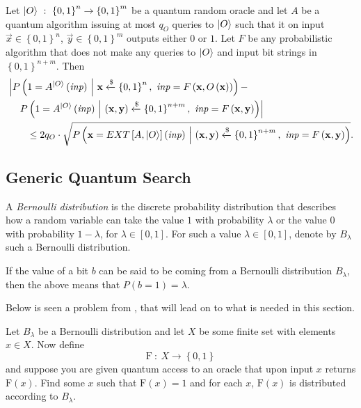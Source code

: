 \begin{lem}
\label{lem:AOW2H}
	Let $\lvert O\rangle \ : \ \left\{ 0,1 \right\}^n \rightarrow \left\{ 0,1 \right\}^m$ be a quantum random oracle and let $A$ be a quantum algorithm issuing at most $q_O$ queries to $\lvert O\rangle$ such that it on input $\vec{x} \in \left\{ 0,1 \right\}^n$, $\vec{y} \in \left\{ 0,1 \right\}^m$ outputs either $0$ or $1$. Let $F$ be any probabilistic algorithm that does not make any queries to $\lvert O\rangle$ and input bit strings in $\left\{ 0,1 \right\}^{n+m}$. Then
\begin{equation*}
	\begin{aligned}
		& \left\vert P\left( 1 = A^{\ket{O}}\left(\mathit{inp}\right) \ \middle\vert \ \vec{x} \xleftarrow{\$} \left\{ 0,1 \right\}^n, \ \mathit{inp} = F\left(\vec{x}, O\left(\vec{x}\right)\right)\right) - \right. \\
			& \quad \left. P\left( 1 = A^{\ket{O}}\left(\mathit{inp}\right) \ \middle\vert \ \left(\vec{x},\vec{y}\right) \xleftarrow{\$} \left\{ 0,1 \right\}^{n+m}, \ \mathit{inp} = F\left(\vec{x},\vec{y}\right) \right) \right\vert \\
			& \qquad \leq 2 q_O \cdot \sqrt{P\left( \vec{x} = EXT\left[A, \ket{O}\right]\left(\mathit{inp}\right) \ \middle\vert \ \left(\vec{x},\vec{y}\right) \xleftarrow{\$} \left\{ 0,1 \right\}^{n+m}, \ \mathit{inp} = F\left(\vec{x},\vec{y}\right)\right) }.
	\end{aligned}
\end{equation*}
\end{lem}



\subsection{Generic Quantum Search}
\label{subsec:genQuaSea}

A \emph{Bernoulli distribution} is the discrete probability distribution that describes how a random variable can take the value $1$ with probability $\lambda$ or the value $0$ with probability $1 - \lambda$, for $\lambda \in \left[0,1\right]$. For such a value $\lambda \in \left[0,1\right]$, denote by $B_{\lambda}$ such a Bernoulli distribution.

If the value of a bit $b$ can be said to be coming from a Bernoulli distribution $B_{\lambda}$, then the above means that $P\left(b = 1\right) = \lambda$.

Below is seen a problem from \cite{HRS,zhandry2}, that will lead on to what is needed in this section.
\begin{prob}
\label{prob:GSP}
	Let $B_{\lambda}$ be a Bernoulli distribution and let $X$ be some finite set with elements $x \in X$. Now define
	\[
		\mathrm{F} \ : \ X \rightarrow \left\{ 0,1 \right\}
	\]
	and suppose you are given quantum access to an oracle that upon input $x$ returns $\mathrm{F}\left(x\right)$. Find some $x$ such that $\mathrm{F}\left(x\right) = 1$ and for each $x$, $\mathrm{F}\left(x\right)$ is distributed according to $B_{\lambda}$.
\end{prob}

